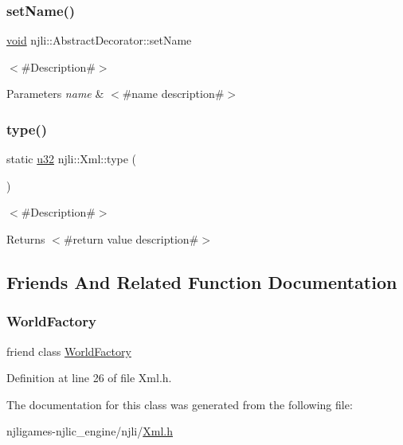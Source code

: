 \subsubsection{\texorpdfstring{set\+Name()}{setName()}}
{\footnotesize\ttfamily \mbox{\hyperlink{_thread_8h_af1e856da2e658414cb2456cb6f7ebc66}{void}} njli\+::\+Abstract\+Decorator\+::set\+Name}

$<$\#\+Description\#$>$


\begin{DoxyParams}{Parameters}
{\em name} & $<$\#name description\#$>$ \\
\hline
\end{DoxyParams}
\mbox{\label{classnjli_1_1_xml_ad75f9b9d5bc5bce8a721b9aa550b7bc5}} 
\subsubsection{\texorpdfstring{type()}{type()}}
{\footnotesize\ttfamily static \mbox{\hyperlink{_util_8h_a10e94b422ef0c20dcdec20d31a1f5049}{u32}} njli\+::\+Xml\+::type (\begin{DoxyParamCaption}{ }\end{DoxyParamCaption})\hspace{0.3cm}{\ttfamily [static]}}

$<$\#\+Description\#$>$

\begin{DoxyReturn}{Returns}
$<$\#return value description\#$>$ 
\end{DoxyReturn}


\subsection{Friends And Related Function Documentation}
\mbox{\label{classnjli_1_1_xml_acb96ebb09abe8f2a37a915a842babfac}} 
\subsubsection{\texorpdfstring{World\+Factory}{WorldFactory}}
{\footnotesize\ttfamily friend class \mbox{\hyperlink{classnjli_1_1_world_factory}{World\+Factory}}\hspace{0.3cm}{\ttfamily [friend]}}



Definition at line 26 of file Xml.\+h.



The documentation for this class was generated from the following file\+:\begin{DoxyCompactItemize}
\item 
njligames-\/njlic\+\_\+engine/njli/\mbox{\hyperlink{_xml_8h}{Xml.\+h}}\end{DoxyCompactItemize}
